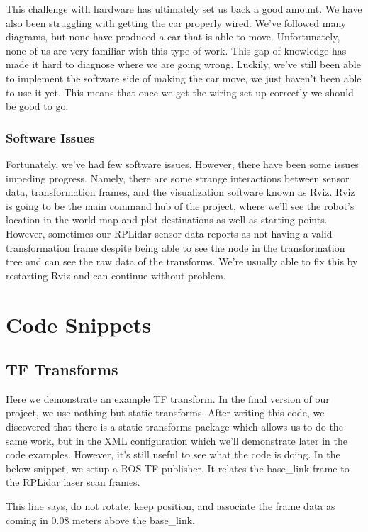 \documentclass[onecolumn, draftclsnofoot, 10pt, compsoc]{IEEEtran}
\begin{document}
This challenge with hardware has ultimately set us back a good amount. We have also been struggling with getting the car properly wired. We've followed many diagrams, but none have produced a car that is able to move. Unfortunately, none of us are very familiar with this type of work. This gap of knowledge has made it hard to diagnose where we are going wrong. Luckily, we've still been able to implement the software side of making the car move, we just haven't been able to use it yet. This means that once we get the wiring set up correctly we should be good to go. 

\subsubsection{Software Issues}
 
Fortunately, we've had few software issues. However, there have been some issues impeding progress. Namely, there are some strange interactions between sensor data, transformation frames, and the visualization software known as Rviz. Rviz is going to be the main command hub of the project, where we'll see the robot's location in the world map and plot destinations as well as starting points. However, sometimes our RPLidar sensor data reports as not having a valid transformation frame despite being able to see the node in the transformation tree and can see the raw data of the transforms. We're usually able to fix this by restarting Rviz and can continue without problem.

\section{Code Snippets}

\subsection{TF Transforms}

Here we demonstrate an example TF transform. In the final version of our project, we use nothing but static transforms. After writing this code, we discovered that there is a static transforms package which allows us to do the same work, but in the XML configuration which we'll demonstrate later in the code examples. However, it's still useful to see what the code is doing. In the below snippet, we setup a ROS TF publisher. It relates the base\_link frame to the RPLidar laser scan frames. 

This line says, do not rotate, keep position, and associate the frame data as coming in 0.08 meters above the base\_link.
\end{document}
